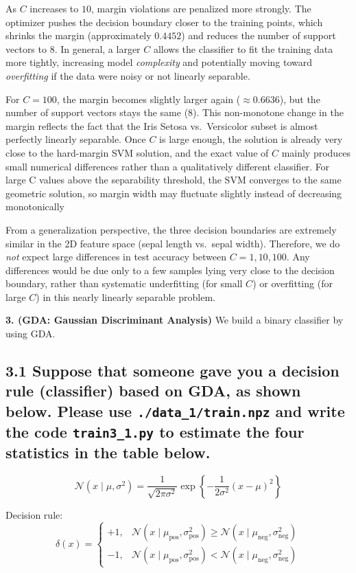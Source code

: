 \documentclass[12pt]{article}
\begin{document}
As $C$ increases to $10$, margin violations are penalized more strongly. The optimizer
pushes the decision boundary closer to the training points, which shrinks the margin
(approximately $0.4452$) and reduces the number of support vectors to 8. In general, a
larger $C$ allows the classifier to fit the training data more tightly, increasing model
\emph{complexity} and potentially moving toward \emph{overfitting} if the data were noisy
or not linearly separable.

For $C = 100$, the margin becomes slightly larger again ($\approx 0.6636$), but the number
of support vectors stays the same (8). This non-monotone change in the margin reflects the
fact that the Iris Setosa vs.\ Versicolor subset is almost perfectly linearly separable. Once
$C$ is large enough, the solution is already very close to the hard-margin SVM solution, and
the exact value of $C$ mainly produces small numerical differences rather than a qualitatively
different classifier.
For large C values above the separability threshold, the SVM converges
to the same geometric solution, so margin width may fluctuate slightly 
instead of decreasing monotonically

From a generalization perspective, the three decision boundaries are extremely similar in the
2D feature space (sepal length vs.\ sepal width). Therefore, we do \emph{not} expect large
differences in test accuracy between $C = 1, 10, 100$. Any differences would be due only to
a few samples lying very close to the decision boundary, rather than systematic underfitting
(for small $C$) or overfitting (for large $C$) in this nearly linearly separable problem.

\newpage\textbf{3. (GDA: Gaussian Discriminant Analysis)} We build a binary classifier by using GDA.

\subsection*{3.1
Suppose that someone gave you a decision rule (classifier) based on GDA, as shown below. Please use \texttt{./data\_1/train.npz} and write the code \texttt{train3\_1.py} to estimate the four statistics in the table below.}

\[
\mathcal{N}(x \mid \mu, \sigma^2)
= \frac{1}{\sqrt{2\pi \sigma^2}}
\exp\left\{ -\frac{1}{2\sigma^2}(x - \mu)^2 \right\}
\]

Decision rule:
\[
\delta(x) =
\begin{cases}
+1, & \mathcal{N}(x \mid \mu_{\text{pos}}, \sigma_{\text{pos}}^2)
    \ge \mathcal{N}(x \mid \mu_{\text{neg}}, \sigma_{\text{neg}}^2) \\[0.5em]
-1, & \mathcal{N}(x \mid \mu_{\text{pos}}, \sigma_{\text{pos}}^2)
    <  \mathcal{N}(x \mid \mu_{\text{neg}}, \sigma_{\text{neg}}^2)
\end{cases}
\]
\end{document}
